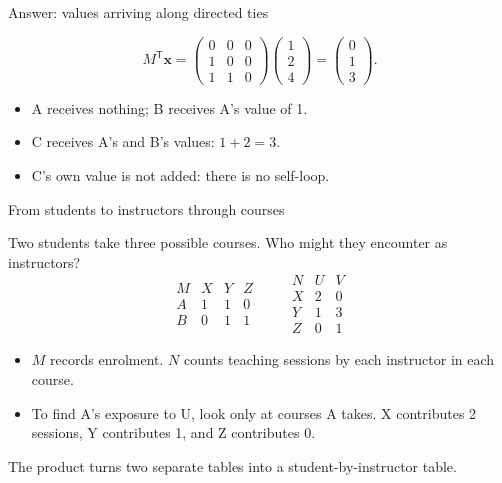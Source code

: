 \documentclass[aspectratio=169,11pt]{beamer}
\begin{document}
\begin{frame}{Answer: values arriving along directed ties}

\[M^{\mathsf T}\mathbf{x}
=\begin{pmatrix}0&0&0\\1&0&0\\1&1&0\end{pmatrix}
\begin{pmatrix}1\\2\\4\end{pmatrix}
=\begin{pmatrix}0\\1\\3\end{pmatrix}.\]
\begin{itemize}
\item A receives nothing; B receives A's value of 1.
\item C receives A's and B's values: $1+2=3$.
\item C's own value is not added: there is no self-loop.
\end{itemize}


\end{frame}

\begin{frame}{From students to instructors through courses}

Two students take three possible courses. Who might they encounter as instructors?
\[
\begin{array}{c|ccc}
M & X & Y & Z\\\hline
A & 1 & 1 & 0\\
B & 0 & 1 & 1
\end{array}
\qquad
\begin{array}{c|cc}
N & U & V\\\hline
X & 2 & 0\\
Y & 1 & 3\\
Z & 0 & 1
\end{array}
\]
\begin{itemize}
\item $M$ records enrolment. $N$ counts teaching sessions by each instructor in each course.
\item To find A's exposure to U, look only at courses A takes. X contributes 2 sessions, Y contributes 1, and Z contributes 0.
\end{itemize}
\textcolor{accent}{The product turns two separate tables into a student-by-instructor table.}

\end{frame}
\end{document}
